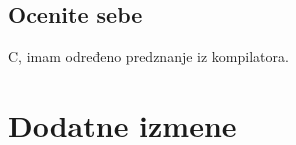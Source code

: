 \documentclass[a4paper]{report}
\begin{document}
\section{Ocenite sebe}

C, imam određeno predznanje iz kompilatora.

\chapter{Dodatne izmene}
\end{document}
